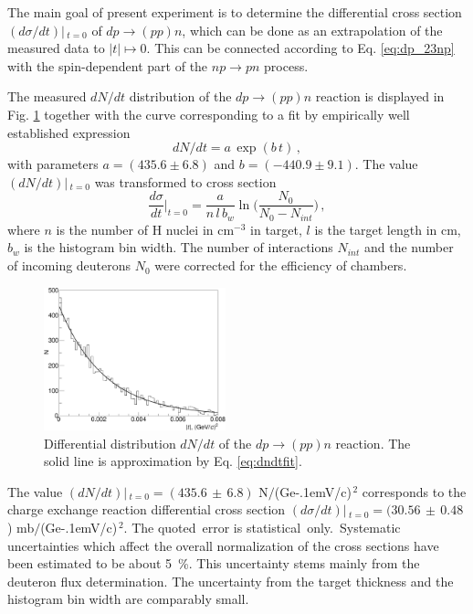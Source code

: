 \documentclass[twocolumn,epjc3]{svjour3}
\newcommand{\np}     {\ensuremath{np \rightarrow pn}\xspace}
\newcommand{\dpchex} {\ensuremath{dp \rightarrow (pp)n}\xspace}
\newcommand{\GeVc}   {Ge\kern-.1emV/c\xspace}
\begin{document}

The main goal of present experiment is to determine the differential cross
section $(d\sigma/dt)|\,_{t=0}$ of \dpchex, which can be done as an
extrapolation of the measured data to $|t|\mapsto0$. This can be connected
according to Eq. \eqref{eq:dp_23np} with the spin-dependent part of the \np
process.

The measured $dN/dt$ distribution of the \dpchex reaction is displayed in
Fig. \ref{fig:dndt} together with the curve corresponding to a fit by
empirically well established expression
\begin{equation}
  \label{eq:dndtfit}
  dN/dt = a\,\exp(b\,t)\,,
\end{equation}
with parameters $a=(435.6 \pm 6.8)$ and $b=(-440.9 \pm 9.1)$.
The value $(dN/dt)|\,_{t=0}$ was transformed to cross section
\begin{equation}
  \frac{d\sigma}{dt}\Big|_{t=0} =
  \frac{a}{n\,l\,b_w}\ln\bigg(\frac{N_0}{N_0-N_{int}}\bigg)\,,
\end{equation}
where $n$ is the number of H nuclei in cm$^{-3}$ in target, $l$ is the target
length in cm, $b_w$ is the histogram bin width. The number of interactions
$N_{int}$ and the number of incoming deuterons $N_0$ were corrected for the
efficiency of chambers.

\begin{figure}[h]
  \centering
  \includegraphics[width=0.47\textwidth]{dp_dN.pdf}
  \caption{Differential distribution $dN/dt$ of the \dpchex reaction. The solid
    line is approximation by Eq. \eqref{eq:dndtfit}.}
  \label{fig:dndt}
\end{figure}

The value $(dN/dt)|\,_{t=0}=(435.6\,\pm\,6.8)$ N$/$(\GeVc)$^{\,2}$ corresponds
to the charge exchange reaction differential cross section
$(d\sigma/dt)|\,_{t=0}=(30.56\,\pm\,0.48$) mb$/$(\GeVc)$^{\,2}$.
The quoted \,error is statistical \,only. \,Systematic uncertainties which
affect the overall normalization of the cross sections have been estimated to be
about 5~\%. This uncertainty stems mainly from the deuteron flux determination.
The uncertainty from the target thickness and the histogram bin width are
comparably small.
\end{document}
